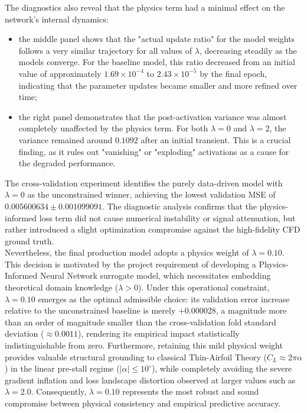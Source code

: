 The diagnostics also reveal that the physics term had a minimal effect on the network's internal dynamics:
\begin{itemize}
    \item[-] the middle panel shows that the "actual update ratio" for the model weights follows a very similar trajectory for all values of $\lambda$, decreasing steadily as the models converge. For the baseline model, this ratio decreased from an initial value of approximately $1.69\times 10^{-4}$ to $2.43\times 10^{-5}$ by the final epoch, indicating that the parameter updates became smaller and more refined over time;
    \item[-] the right panel demonstrates that the post-activation variance was almost completely unaffected by the physics term. For both $\lambda=0$ and $\lambda=2$, the variance remained around $0.1092$ after an initial transient. This is a crucial finding, as it rules out "vanishing" or "exploding" activations as a cause for the degraded performance.
\end{itemize}
\vspace{2ex}

The cross-validation experiment identifies the purely data-driven model with $\lambda=0$ as the unconstrained winner, achieving the lowest validation MSE of $0.005600634\pm0.001099091$. The diagnostic analysis confirms that the physics-informed loss term did not cause numerical instability or signal attenuation, but rather introduced a slight optimization compromise against the high-fidelity CFD ground truth.\\

Nevertheless, the final production model adopts a physics weight of $\lambda=0.10$. This decision is motivated by the project requirement of developing a Physics-Informed Neural Network surrogate model, which necessitates embedding theoretical domain knowledge ($\lambda > 0$). Under this operational constraint, $\lambda=0.10$ emerges as the optimal admissible choice: its validation error increase relative to the unconstrained baseline is merely $+0.000028$, a magnitude more than an order of magnitude smaller than the cross-validation fold standard deviation ($\approx 0.0011$), rendering its empirical impact statistically indistinguishable from zero. Furthermore, retaining this mild physical weight provides valuable structural grounding to classical Thin-Airfoil Theory ($C_L \approx 2\pi\alpha$) in the linear pre-stall regime ($|\alpha|\leq 10^\circ$), while completely avoiding the severe gradient inflation and loss landscape distortion observed at larger values such as $\lambda=2.0$. Consequently, $\lambda=0.10$ represents the most robust and sound compromise between physical consistency and empirical predictive accuracy.


